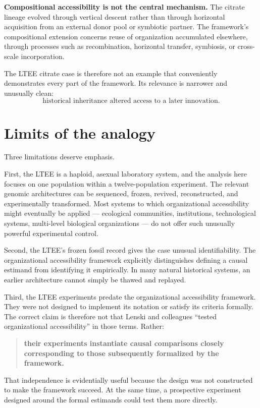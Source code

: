 \documentclass[11pt]{article}
\begin{document}
\textbf{Compositional accessibility is not the central mechanism.} The citrate lineage evolved through vertical descent rather than through horizontal acquisition from an external donor pool or symbiotic partner. The framework's compositional extension concerns reuse of organization accumulated elsewhere, through processes such as recombination, horizontal transfer, symbiosis, or cross-scale incorporation.

The LTEE citrate case is therefore not an example that conveniently demonstrates every part of the framework. Its relevance is narrower and unusually clean:
\[
\boxed{\text{historical inheritance altered access to a later innovation}.}
\]

\section{Limits of the analogy}

Three limitations deserve emphasis.

First, the LTEE is a haploid, asexual laboratory system, and the analysis here focuses on one population within a twelve-population experiment. The relevant genomic architectures can be sequenced, frozen, revived, reconstructed, and experimentally transformed. Most systems to which organizational accessibility might eventually be applied --- ecological communities, institutions, technological systems, multi-level biological organizations --- do not offer such unusually powerful experimental control.

Second, the LTEE's frozen fossil record gives the case unusual identifiability. The organizational accessibility framework explicitly distinguishes defining a causal estimand from identifying it empirically. In many natural historical systems, an earlier architecture cannot simply be thawed and replayed.

Third, the LTEE experiments predate the organizational accessibility framework. They were not designed to implement its notation or satisfy its criteria formally. The correct claim is therefore not that Lenski and colleagues ``tested organizational accessibility'' in those terms. Rather:

\begin{quote}
\textbf{their experiments instantiate causal comparisons closely corresponding to those subsequently formalized by the framework.}
\end{quote}

That independence is evidentially useful because the design was not constructed to make the framework succeed. At the same time, a prospective experiment designed around the formal estimands could test them more directly.
\end{document}
